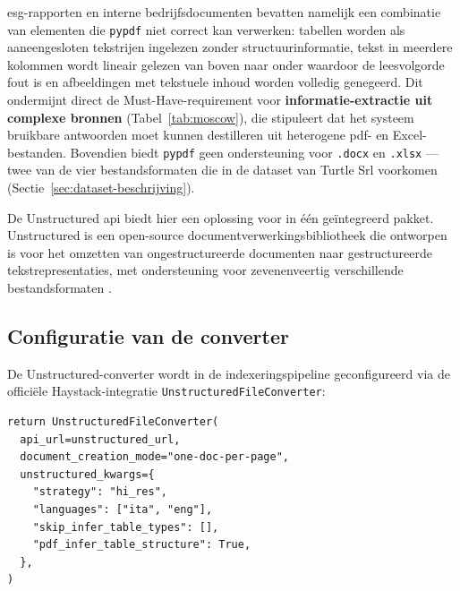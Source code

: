 \gls{esg}-rapporten en interne bedrijfsdocumenten bevatten namelijk een combinatie van elementen die \texttt{pypdf} niet correct kan verwerken: tabellen worden als aaneengesloten tekstrijen ingelezen zonder structuurinformatie, tekst in meerdere kolommen wordt lineair gelezen van boven naar onder waardoor de leesvolgorde fout is en afbeeldingen met tekstuele inhoud worden volledig genegeerd. Dit ondermijnt direct de Must-Have-requirement voor \textbf{informatie-extractie uit complexe bronnen} (Tabel~\ref{tab:moscow}), die stipuleert dat het systeem bruikbare antwoorden moet kunnen destilleren uit heterogene \gls{pdf}- en Excel-bestanden. Bovendien biedt \texttt{pypdf} geen ondersteuning voor \texttt{.docx} en \texttt{.xlsx} — twee van de vier bestandsformaten die in de dataset van Turtle Srl voorkomen (Sectie~\ref{sec:dataset-beschrijving}).

De Unstructured \gls{api} biedt hier een oplossing voor in één geïntegreerd pakket. Unstructured is een open-source documentverwerkingsbibliotheek die ontworpen is voor het omzetten van ongestructureerde documenten naar gestructureerde tekstrepresentaties, met ondersteuning voor zevenenveertig verschillende bestandsformaten \autocite{UnstructuredDocs2024}.

\subsection{Configuratie van de converter}

De Unstructured-converter wordt in de indexeringspipeline geconfigureerd via de officiële Haystack-integratie \texttt{UnstructuredFileConverter}:

\begin{listing}[H]
\begin{verbatim}
return UnstructuredFileConverter(
  api_url=unstructured_url,
  document_creation_mode="one-doc-per-page",
  unstructured_kwargs={
    "strategy": "hi_res",
    "languages": ["ita", "eng"],
    "skip_infer_table_types": [],
    "pdf_infer_table_structure": True,
  },
)
\end{verbatim}
\caption[Unstructured converter-configuratie]{De Unstructured-converter ondersteunt Italiaans en Engels — conform de Should-Have-requirement voor meertalige ondersteuning (Tabel~\ref{tab:moscow}) — en gebruikt de \texttt{hi\_res}-strategie voor nauwkeurige extractie van tabellen en lay-outcomplexe documenten.}
\label{lst:unstructured-config}
\end{listing}

